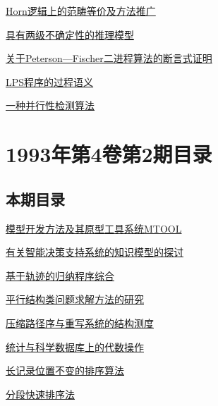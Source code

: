 \documentclass[a4paper]{article}
\begin{document}
\href{http://www.jos.org.cn/ch/reader/download_pdf.aspx?file_no=19930308&year_id=1993&quarter_id=3&falg=1}{Horn逻辑上的范畴等价及方法推广}

\href{http://www.jos.org.cn/ch/reader/download_pdf.aspx?file_no=19930309&year_id=1993&quarter_id=3&falg=1}{具有两级不确定性的推理模型}

\href{http://www.jos.org.cn/ch/reader/download_pdf.aspx?file_no=19930310&year_id=1993&quarter_id=3&falg=1}{关于Peterson—Fischer二进程算法的断言式证明}

\href{http://www.jos.org.cn/ch/reader/download_pdf.aspx?file_no=19930311&year_id=1993&quarter_id=3&falg=1}{LPS程序的过程语义}

\href{http://www.jos.org.cn/ch/reader/download_pdf.aspx?file_no=19930312&year_id=1993&quarter_id=3&falg=1}{一种并行性检测算法}


\section{\textbf{1993年第4卷第2期目录}}
\subsection{本期目录}
\href{http://www.jos.org.cn/ch/reader/download_pdf.aspx?file_no=19930201&year_id=1993&quarter_id=2&falg=1}{模型开发方法及其原型工具系统MTOOL}

\href{http://www.jos.org.cn/ch/reader/download_pdf.aspx?file_no=19930202&year_id=1993&quarter_id=2&falg=1}{有关智能决策支持系统的知识模型的探讨}

\href{http://www.jos.org.cn/ch/reader/download_pdf.aspx?file_no=19930203&year_id=1993&quarter_id=2&falg=1}{基于轨迹的归纳程序综合}

\href{http://www.jos.org.cn/ch/reader/download_pdf.aspx?file_no=19930204&year_id=1993&quarter_id=2&falg=1}{平行结构类问题求解方法的研究}

\href{http://www.jos.org.cn/ch/reader/download_pdf.aspx?file_no=19930205&year_id=1993&quarter_id=2&falg=1}{压缩路径序与重写系统的结构测度}

\href{http://www.jos.org.cn/ch/reader/download_pdf.aspx?file_no=19930206&year_id=1993&quarter_id=2&falg=1}{统计与科学数据库上的代数操作}

\href{http://www.jos.org.cn/ch/reader/download_pdf.aspx?file_no=19930207&year_id=1993&quarter_id=2&falg=1}{长记录位置不变的排序算法}

\href{http://www.jos.org.cn/ch/reader/download_pdf.aspx?file_no=19930208&year_id=1993&quarter_id=2&falg=1}{分段快速排序法}
\end{document}

